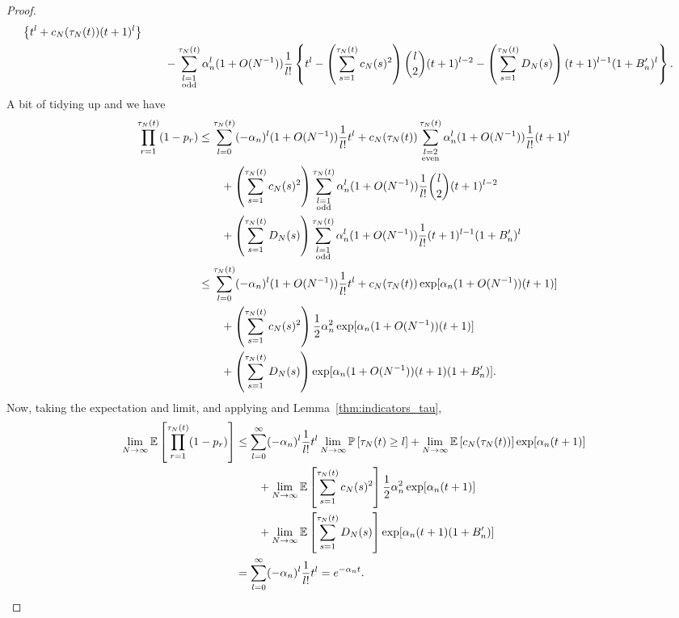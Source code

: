 \documentclass{article}
\newcommand{\Prob}{\mathbb{P}}
\newcommand{\E}{\mathbb{E}}
\newcommand{\1}[1]{\mathbbm{1}_{#1}}
\begin{document}
\begin{proof}
\begin{align}
        \left\{ t^l + c_N(\tau_N(t)) (t+1)^l \right\} \notag\\
    &\qquad- \sum_{\substack{l=1 \\ \text{odd} }}^{\tau_N(t)} 
        \alpha_n^l (1+O(N^{-1})) \frac{1}{l!} 
        \left\{ t^l - \left( \sum_{s=1}^{\tau_N(t)} c_N(s)^2 \right) 
        \binom{l}{2} (t+1)^{l-2}
        - \left( \sum_{s=1}^{\tau_N(t)} D_N(s) \right) 
        (t+1)^{l-1} (1+B_n^\prime)^l \right\} .
\end{align}
A bit of tidying up and we have
\begin{align}
\prod_{r=1}^{\tau_N(t)} (1-p_r)
&\leq \sum_{l=0}^{\tau_N(t)} (-\alpha_n)^l (1+O(N^{-1})) \frac{1}{l!} t^l
    + c_N(\tau_N(t)) \sum_{\substack{l=2 \\ \text{even} }}^{\tau_N(t)}
        \alpha_n^l (1+O(N^{-1})) \frac{1}{l!} (t+1)^l \notag\\
    &\qquad+ \left( \sum_{s=1}^{\tau_N(t)} c_N(s)^2 \right)
        \sum_{\substack{l=1 \\ \text{odd} }}^{\tau_N(t)} \alpha_n^l
        (1+O(N^{-1})) \frac{1}{l!} \binom{l}{2} (t+1)^{l-2} \notag\\
    &\qquad+ \left( \sum_{s=1}^{\tau_N(t)} D_N(s) \right) 
        \sum_{\substack{l=1 \\ \text{odd} }}^{\tau_N(t)} \alpha_n^l
        (1+O(N^{-1})) \frac{1}{l!} (t+1)^{l-1} (1+B_n^\prime)^l \notag\\
&\leq \sum_{l=0}^{\tau_N(t)} (-\alpha_n)^l (1+O(N^{-1})) \frac{1}{l!} t^l
    + c_N(\tau_N(t)) \exp[ \alpha_n (1+O(N^{-1})) (t+1) ] \notag\\
    &\qquad+ \left( \sum_{s=1}^{\tau_N(t)} c_N(s)^2 \right)
        \frac{1}{2} \alpha_n^2 \exp[ \alpha_n (1+O(N^{-1})) (t+1) ] \notag\\
    &\qquad+ \left( \sum_{s=1}^{\tau_N(t)} D_N(s) \right)
        \exp[ \alpha_n (1+O(N^{-1})) (t+1) (1+B_n^\prime) ] . \label{eq:021}
\end{align}
Now, taking the expectation and limit, and applying \citet[Equations (3.3)--(3.5)]{brown2021} and Lemma~\ref{thm:indicators_tau},
\begin{align}
\lim_{N\to\infty} \E \left[ \prod_{r=1}^{\tau_N(t)} (1-p_r) \right]
&\leq \sum_{l=0}^{\infty} (-\alpha_n)^l \frac{1}{l!} t^l
        \lim_{N\to\infty} \Prob \left[ \tau_N(t) \geq l \right]
    + \lim_{N\to\infty} \E \left[ c_N(\tau_N(t)) \right]
        \exp[ \alpha_n (t+1) ] \notag\\
    &\qquad+ \lim_{N\to\infty} \E \left[ \sum_{s=1}^{\tau_N(t)} 
        c_N(s)^2 \right]
        \frac{1}{2} \alpha_n^2 \exp[ \alpha_n (t+1) ] \notag\\
    &\qquad+ \lim_{N\to\infty} \E \left[ \sum_{s=1}^{\tau_N(t)} D_N(s) \right]
        \exp[ \alpha_n (t+1) (1+B_n^\prime) ] \notag\\
&= \sum_{l=0}^{\infty} (-\alpha_n)^l \frac{1}{l!} t^l
= e^{-\alpha_n t}. \label{eq:022}
\end{align}


\end{proof}
\end{document}
